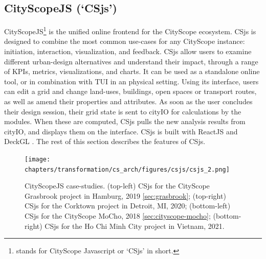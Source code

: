 {  \subsection{CityScopeJS (`CSjs')}
  {
      CityScopeJS\footnote{stands for CityScope Javascript or `CSjs' in short.} is the unified online frontend for the CityScope ecosystem. CSjs is designed to combine the most common use-cases for any CityScope instance: initiation, interaction, visualization, and feedback. CSjs allow users to examine different urban-design alternatives and understand their impact, through a range of KPIs, metrics, visualizations, and charts. It can be used as a standalone online tool, or in combination with TUI in an physical setting. Using its interface, users can edit a grid and change land-uses, buildings, open spaces or transport routes, as well as amend their properties and attributes. As soon as the user concludes their design session, their grid state is sent to cityIO for calculations by the modules. When these are computed, CSjs pulls the new analysis results from cityIO, and displays them on the interface. CSjs is built with ReactJS and DeckGL \cite{ReactAJ49:online,deckgl17:online}. The rest of this section describes the features of CSjs.

      \begin{figure}[!htb]
          \begin{center}
              \texttt{[image: chapters/transformation/cs\_arch/figures/csjs/csjs\_2.png]}
          \end{center}
          \caption{CityScopeJS case-studies. (top-left) CSjs for the CityScope Grasbrook project in Hamburg, 2019 \eqref{sec:grasbrook}; (top-right) CSjs for the Corktown project in Detroit, MI, 2020; (bottom-left) CSjs for the CityScope MoCho, 2018 \eqref{sec:cityscope-mocho}; (bottom-right) CSjs for the Ho Chi Minh City project in Vietnam, 2021.}
          \label{fig:csjs_versions}
      \end{figure}


}}
